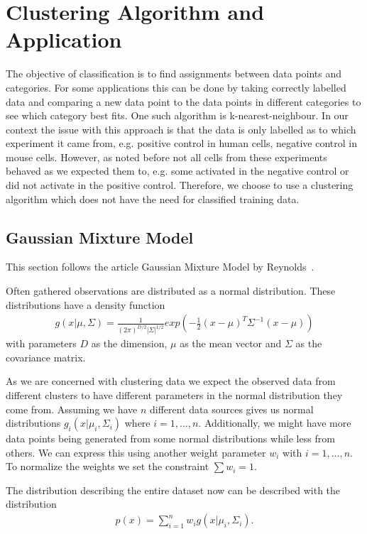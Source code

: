 \chapter{Clustering Algorithm and Application}
\label{chapter:clustering}

The objective of classification is to find assignments between data points and categories. For some applications this can be done by taking correctly labelled data and comparing a new data point to the data points in different categories to see which category best fits. One such algorithm is k-nearest-neighbour. In our context the issue with this approach is that the data is only labelled as to which experiment it came from, e.g. positive control in human cells, negative control in mouse cells. However, as noted before not all cells from these experiments behaved as we expected them to, e.g. some activated in the negative control or did not activate in the positive control. Therefore, we choose to use a clustering algorithm which does not have the need for classified training data.

\section{Gaussian Mixture Model}
\label{sec:gaussian_mixture_model}

This section follows the article Gaussian Mixture Model by Reynolds~\cite{reynolds2009}.

Often gathered observations are distributed as a normal distribution. These distributions have a density function
\begin{align*}
	g(x|\mu, \Sigma) = \frac{1}{(2\pi)^{D/2} |\Sigma|^{1/2}} exp\left( - \frac{1}{2} (x-\mu)^T \Sigma^{-1} (x-\mu) \right)
\end{align*}
with parameters $D$ as the dimension, $\mu$ as the mean vector and $\Sigma$ as the covariance matrix.

As we are concerned with clustering data we expect the observed data from different clusters to have different parameters in the normal distribution they come from. Assuming we have $n$ different data sources gives us normal distributions $g_i(x|\mu_i, \Sigma_i)$ where $i=1, ..., n$. Additionally, we might have more data points being generated from some normal distributions while less from others. We can express this using another weight parameter $w_i$ with $i=1, ..., n$. To normalize the weights we set the constraint $\sum w_i = 1$.

The distribution describing the entire dataset now can be described with the distribution
\begin{align}
	\label{eq:sum_of_normal}
	p(x) = \sum_{i=1}^{n} w_i g(x|\mu_i, \Sigma_i).
\end{align}

